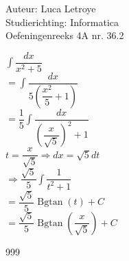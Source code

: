 \documentclass[a4paper]{article}
\newcommand{\bgtan}{\operatorname{Bgtan}}
\begin{document}
  
\noindent \large Auteur: Luca Letroye \\
\noindent \large Studierichting: Informatica\\
\noindent \large Oefeningenreeks 4A nr. 36.2

\medskip
\normalsize

$\displaystyle\int \dfrac{dx}{x^2+5} $\\

$ = \displaystyle\int \dfrac{dx}{5\left(\dfrac{x^2}{5}+1\right)} $\\

$ = \dfrac{1}{5}\displaystyle\int \dfrac{dx}{\left(\dfrac{x}{\sqrt{5}}\right)^2+1} $\\

$t = \dfrac{x}{\sqrt{5}}\Rightarrow dx = \sqrt{5}dt $\\

$\Rightarrow \dfrac{\sqrt{5}}{5} \displaystyle\int \dfrac{1}{t^2+1}$\\

$= \dfrac{\sqrt{5}}{5} \bgtan(t) +C$\\

$= \dfrac{\sqrt{5}}{5} \bgtan\left(\dfrac{x}{\sqrt{5}}\right) +C$\\



\begin{thebibliography}{999}
\end{thebibliography}
\end{document}
